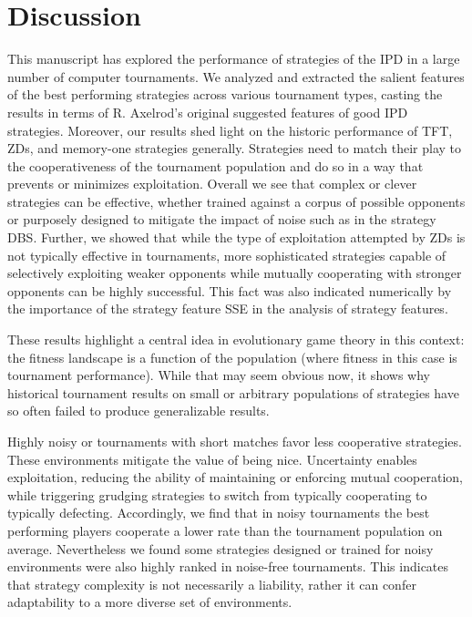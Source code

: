 \documentclass{article}
\newcommand{\numberofstrategies}{}
\begin{document}
\section{Discussion}\label{section:conclusion}

This manuscript has explored the performance of \numberofstrategies strategies
of the IPD in a large number of computer tournaments.
We analyzed and extracted the salient features of the best performing strategies
across various tournament types, casting the results in terms of R. Axelrod's
original suggested features of good IPD strategies. Moreover, our results
shed light on the historic performance of TFT, ZDs,
and memory-one strategies generally. Strategies need to match their play
to the cooperativeness of the tournament population and do so in a way that
prevents or minimizes exploitation. Overall we see that complex or clever
strategies can be effective, whether trained against a corpus of possible
opponents or purposely designed to mitigate the impact of noise such as
in the strategy DBS. Further, we showed that while the type of exploitation
attempted by ZDs is not typically effective in tournaments, more
sophisticated strategies capable of selectively exploiting weaker opponents
while mutually cooperating with stronger opponents can be highly successful.
This fact was also indicated numerically by the importance of the strategy
feature SSE in the analysis of strategy features.


These results highlight
a central idea in evolutionary game theory in this context: the fitness
landscape is a function of the population (where fitness in this case is
tournament performance). While that may seem obvious now, it shows why
historical tournament results on small or arbitrary populations of strategies
have so often failed to produce generalizable results.

Highly noisy or tournaments with short matches favor less cooperative strategies.
These environments mitigate the value of being nice. Uncertainty enables
exploitation, reducing the ability of maintaining or enforcing mutual cooperation,
while triggering grudging strategies to switch from typically cooperating to
typically defecting. Accordingly, we find that in noisy tournaments
the best performing players cooperate a lower rate than the tournament
population on average. Nevertheless we found some strategies designed or trained
for noisy environments were also highly ranked in noise-free tournaments. This
indicates that strategy complexity is not necessarily a liability, rather it
can confer adaptability to a more diverse set of environments.
\end{document}
